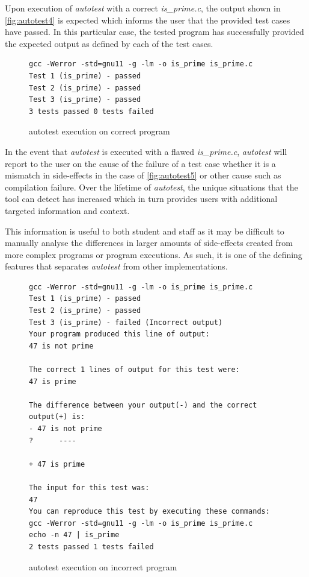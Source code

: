 \documentclass[hidelinks]{report}
\begin{document}
Upon execution of \textit{autotest} with a correct \textit{is\_prime.c}, the output shown in \autoref{fig:autotest4} is expected which informs the user that the provided test cases have passed. In this particular case, the tested program has successfully provided the expected output as defined by each of the test cases.

\begin{figure}[h]
	\centering
	\begin{lstlisting}[breaklines=true, linewidth=\linewidth]
gcc -Werror -std=gnu11 -g -lm -o is_prime is_prime.c
Test 1 (is_prime) - passed
Test 2 (is_prime) - passed
Test 3 (is_prime) - passed
3 tests passed 0 tests failed
	\end{lstlisting}
	\caption{autotest execution on correct program}
	\label{fig:autotest4}
\end{figure}

In the event that \textit{autotest} is executed with a flawed \textit{is\_prime.c}, \textit{autotest} will report to the user on the cause of the failure of a test case whether it is a mismatch in side-effects in the case of \autoref{fig:autotest5} or other cause such as compilation failure. Over the lifetime of \textit{autotest}, the unique situations that the tool can detect has increased which in turn provides users with additional targeted information and context.

This information is useful to both student and staff as it may be difficult to manually analyse the differences in larger amounts of side-effects created from more complex programs or program executions.  As such, it is one of the defining features that separates \textit{autotest} from other implementations.

\begin{figure}[h]
	\centering
	\begin{lstlisting}[breaklines=true, linewidth=\linewidth]
gcc -Werror -std=gnu11 -g -lm -o is_prime is_prime.c
Test 1 (is_prime) - passed
Test 2 (is_prime) - passed
Test 3 (is_prime) - failed (Incorrect output)
Your program produced this line of output:
47 is not prime

The correct 1 lines of output for this test were:
47 is prime

The difference between your output(-) and the correct output(+) is:
- 47 is not prime
?      ----

+ 47 is prime

The input for this test was:
47
You can reproduce this test by executing these commands:
gcc -Werror -std=gnu11 -g -lm -o is_prime is_prime.c
echo -n 47 | is_prime
2 tests passed 1 tests failed
	\end{lstlisting}
	\caption{autotest execution on incorrect program}
	\label{fig:autotest5}
\end{figure}
\end{document}
